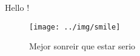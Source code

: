 \documentclass{article}
\begin{document}
  Hello !
  \begin{figure}[h!]
    \centering
        \texttt{[image: ../img/smile]}
      \caption{Mejor sonreir que estar serio}
  \end{figure}
\end{document}
